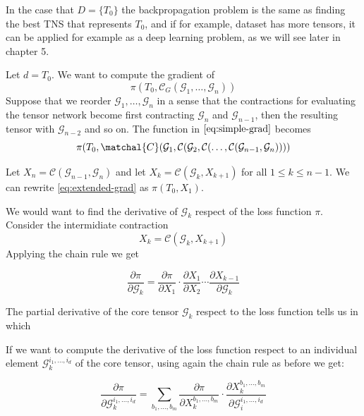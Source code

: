 \documentclass[11pt,a4paper,openright,oneside]{book}
\numberwithin{equation}{section}
\begin{document}
{In the case that $D = \{T_0\}$ the backpropagation problem is the same as finding the best TNS that represents $T_0$, and if
for example, dataset has more tensors, it can be applied for example as a deep learning problem, as we will see later in chapter 5.

Let $d = T_0$. We want to compute the gradient of
\begin{equation}
\pi(T_0, \mathcal{C}_G(\mathcal{G}_1, \dots, \mathcal{G}_n))
\label{eq:simple-grad}
\end{equation}
Suppose that we reorder $\mathcal{G}_1, \dots, \mathcal{G}_n$ in a sense that the contractions for evaluating the tensor
network become first contracting $\mathcal{G}_n$ and $\mathcal{G}_{n-1}$, then the resulting tensor with $\mathcal{G}_{n-2}$
and so on. The function in $\ref{eq:simple-grad}$ becomes
\begin{equation}
    \pi(T_0, \matchal{C}(\mathcal{G}_1, \mathcal{C}( \mathcal{G}_2, \mathcal{C}(\dots, \mathcal{C}(\mathcal{G}_{n-1}, \mathcal{G}_n))))
    \label{eq:extended-grad}
\end{equation}

Let $X_n = \mathcal{C}(\mathcal{G}_{n-1}, \mathcal{G}_n)$ and let $X_{k} = \mathcal{C}(\mathcal{G}_k, X_{k+1})$ for all $1 \leqslant k \leqslant n - 1$.
We can rewrite \ref{eq:extended-grad} as $\pi(T_0, X_1)$.

We would want to find the derivative of $\mathcal{G}_k$ respect of the loss function $\pi$. Consider the intermidiate
contraction $$X_k = \mathcal{C}(\mathcal{G}_k, X_{k+1})$$
Applying the chain rule we get

\begin{equation}
    \frac{\partial \pi}{\partial \mathcal{G}_k} = \frac{\partial \pi}{\partial X_1} \cdot \frac{\partial X_1}{\partial X_2} \cdots
    \frac{\partial X_{k-1}}{\partial \mathcal{G}_{k}}
\end{equation}

The partial derivative of the core tensor $\mathcal{G}_k$ respect to the loss function tells us in which 

If we want to compute the derivative of the loss function respect to an individual element $\mathcal{G}_k^{i_1, \dots, i_d}$
of the core tensor, using again the chain rule as before we get:

\begin{equation}
    \frac{\partial \pi}{\partial \mathcal{G}_k^{i_1, \dots, i_d}} = \sum_{b_1, \dots, b_m} \frac{\partial \pi}{\partial X_k^{b_1, \dots, b_m}} \cdot 
    \frac{\partial X_k^{b_1, \dots, b_m}}{\partial \mathcal{G}_i^{i_1, \dots, i_d}}
\end{equation}

}
\end{document}
